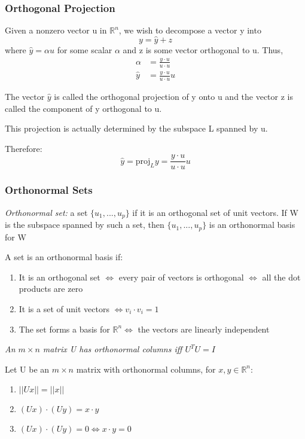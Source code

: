 \documentclass[12pt]{article} %
\newcommand{\R}{\mathbb{R}}
\begin{document}
\subsubsection{Orthogonal Projection}
Given a nonzero vector u in $\R^n$, we wish to decompose a vector y into $$y = \hat{y} + z$$ where $\hat{y} = \alpha u$ for some scalar $\alpha$ and z is some vector orthogonal to u. 
Thus, 
\begin{align*}
	\alpha &= \frac{y \cdot u}{u \cdot u}\\
	\hat{y} &= \frac{y \cdot u}{u \cdot u} u
\end{align*}

The vector $\hat{y}$ is called the orthogonal projection of y onto u and the vector z is called the component of y orthogonal to u.

This projection is actually determined by the subspace L spanned by u.

Therefore:
$$\hat{y} = \text{proj}_L y = \frac{y \cdot u}{u \cdot u} u$$

\subsubsection{Orthonormal Sets}
\emph{Orthonormal set:} a set $\{u_1, ..., u_p\}$ if it is an orthogonal set of unit vectors. If W is the subspace spanned by such a set, then $\{u_1, ..., u_p\}$ is an orthonormal basis for W

A set is an orthonormal basis if:
\begin{enumerate}
	\item It is an orthogonal set $\iff$ every pair of vectors is orthogonal $\iff$ all the dot products are zero
	\item It is a set of unit vectors $\iff v_i \cdot v_i = 1$
	\item The set forms a basis for $\R^n \iff$ the vectors are linearly independent 
\end{enumerate}

\emph{An $m \times n$ matrix U has orthonormal columns iff $U^T U = I$}

Let U be an $m \times n$ matrix with orthonormal columns, for $x, y \in \R^n$:
\begin{enumerate}
	\item $||U x|| = ||x||$
	\item $(Ux) \cdot (Uy) = x \cdot y$
	\item $(Ux) \cdot (Uy) = 0 \iff x \cdot y = 0$ 
\end{enumerate}
\end{document}
